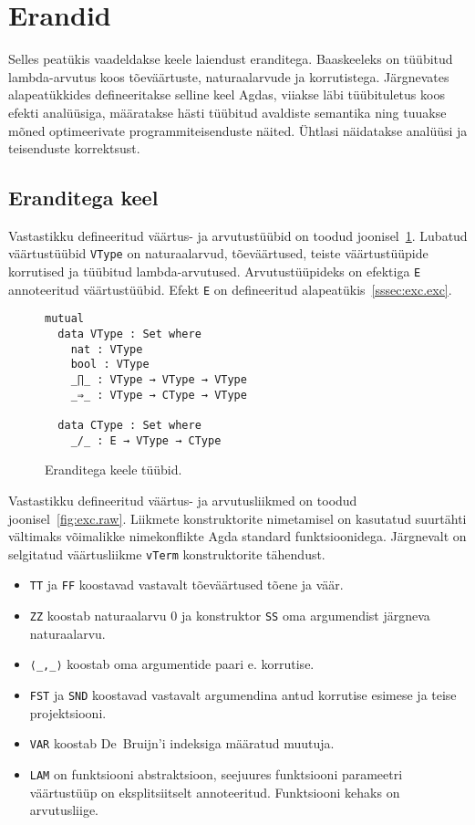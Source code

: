 \documentclass[a4paper,12pt]{article}
\begin{document}
\clearpage

\section{Erandid}

Selles peatükis vaadeldakse keele laiendust eranditega. 
Baaskeeleks on tüübitud lambda-arvutus koos tõeväärtuste, naturaalarvude ja korrutistega.
Järgnevates alapeatükkides defineeritakse selline keel Agdas,
viiakse läbi tüübituletus koos efekti analüüsiga,
määratakse hästi tüübitud avaldiste semantika
ning tuuakse mõned optimeerivate programmiteisenduste näited.
Ühtlasi näidatakse analüüsi ja teisenduste korrektsust.

\subsection{Eranditega keel}\label{ssec:exc.raw}

Vastastikku defineeritud väärtus- ja arvutustüübid on toodud joonisel~\ref{fig:exc.types}.
Lubatud väärtustüübid {\tt VType} on naturaalarvud, tõeväärtused, teiste väärtustüüpide korrutised ja tüübitud lambda-arvutused.
Arvutustüüpideks on efektiga {\tt E} annoteeritud väärtustüübid. Efekt {\tt E} on defineeritud alapeatükis~\ref{sssec:exc.exc}.
\begin{figure}
  \begin{verbatim}
mutual
  data VType : Set where
    nat : VType
    bool : VType
    _∏_ : VType → VType → VType
    _⇒_ : VType → CType → VType

  data CType : Set where
    _/_ : E → VType → CType\end{verbatim}
  \caption{Eranditega keele tüübid.}
  \label{fig:exc.types}
\end{figure}


Vastastikku defineeritud väärtus- ja arvutusliikmed on toodud joonisel~\ref{fig:exc.raw}.
Liikmete konstruktorite nimetamisel on kasutatud suurtähti vältimaks võimalikke nimekonflikte Agda standard funktsioonidega.
Järgnevalt on selgitatud väärtusliikme {\tt vTerm} konstruktorite tähendust.
\begin{itemize}
\item {\tt TT} ja {\tt FF} koostavad vastavalt tõeväärtused tõene ja väär.
\item {\tt ZZ} koostab naturaalarvu 0 ja konstruktor {\tt SS} oma argumendist järgneva naturaalarvu.
\item {\tt ⟨_,_⟩} koostab oma argumentide paari e. korrutise.
\item {\tt FST} ja {\tt SND} koostavad vastavalt argumendina antud korrutise esimese ja teise projektsiooni.
\item {\tt VAR} koostab De~Bruijn'i indeksiga määratud muutuja.
\item {\tt LAM} on funktsiooni abstraktsioon, seejuures funktsiooni parameetri väärtustüüp on eksplitsiitselt annoteeritud. Funktsiooni kehaks on arvutusliige.
\end{itemize}
\end{document}
